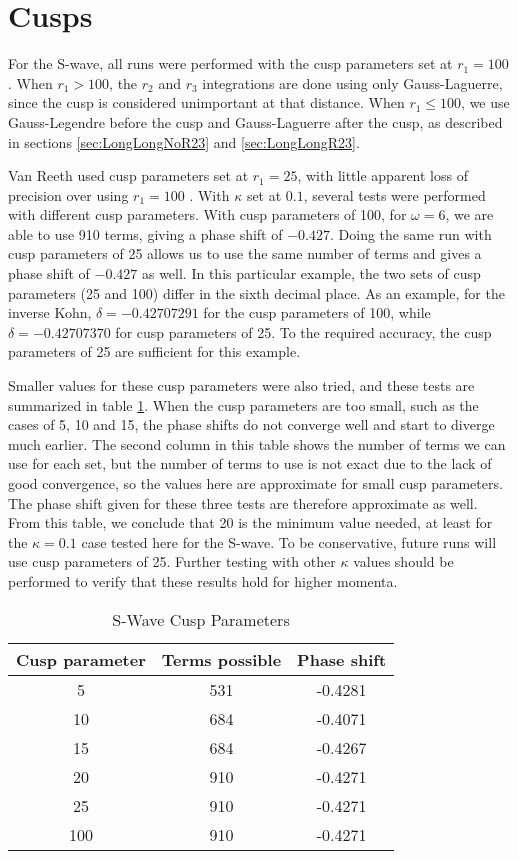 \documentclass[Dissertation.tex]{subfiles}
\begin{document}
\section{Cusps}

For the S-wave, all runs were performed with the cusp parameters set at $r_1 = 100$. When $r_1 > 100$, the $r_2$ and $r_3$ integrations are done using only Gauss-Laguerre, since the cusp is considered unimportant at that distance. When $r_1 \leq 100$, we use Gauss-Legendre before the cusp and Gauss-Laguerre after the cusp, as described in sections \ref{sec:LongLongNoR23} and \ref{sec:LongLongR23}. 

Van Reeth used cusp parameters set at $r_1 = 25$, with little apparent loss of precision over using $r_1 = 100$ \cite{}. With $\kappa$ set at $0.1$, several tests were performed with different cusp parameters. With cusp parameters of 100, for $\omega = 6$, we are able to use 910 terms, giving a phase shift of $-0.427$. Doing the same run with cusp parameters of 25 allows us to use the same number of terms and gives a phase shift of $-0.427$ as well. In this particular example, the two sets of cusp parameters (25 and 100) differ in the sixth decimal place. As an example, for the inverse Kohn, $\delta = -0.42707291$ for the cusp parameters of 100, while $\delta = -0.42707370$ for cusp parameters of 25. To the required accuracy, the cusp parameters of 25 are sufficient for this example.

Smaller values for these cusp parameters were also tried, and these tests are summarized in table \ref{tab:SWaveCuspParameters}. When the cusp parameters are too small, such as the cases of 5, 10 and 15, the phase shifts do not converge well and start to diverge much earlier. The second column in this table shows the number of terms we can use for each set, but the number of terms to use is not exact due to the lack of good convergence, so the values here are approximate for small cusp parameters. The phase shift given for these three tests are therefore approximate as well. From this table, we conclude that 20 is the minimum value needed, at least for the $\kappa = 0.1$ case tested here for the S-wave. To be conservative, future runs will use cusp parameters of 25. Further testing with other $\kappa$ values should be performed to verify that these results hold for higher momenta.

\begin{table}[H]
\centering
\begin{tabular}{c c c}
\toprule
Cusp parameter & Terms possible & Phase shift \\
\midrule
 5 & 531 & -0.4281 \\
10 & 684 & -0.4071 \\
15 & 684 & -0.4267 \\
20 & 910 & -0.4271 \\
25 & 910 & -0.4271 \\
100 & 910 & -0.4271 \\
\bottomrule
\end{tabular}
\caption{S-Wave Cusp Parameters}
\label{tab:SWaveCuspParameters}
\end{table}
\end{document}

